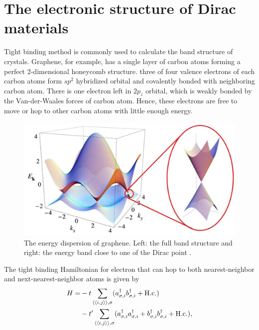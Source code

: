 \section{The electronic structure of Dirac materials}
     Tight binding method is commonly used to calculate the band structure of crystals.
     Graphene, for example, has a single layer of carbon atoms forming a perfect 2-dimensional honeycomb structure.
     three of four valence electrons of each carbon atoms form $sp^2$ hybridized orbital and covalently bonded with neighboring carbon atom.
     There is one electron left in $2p_z$ orbital, which is weakly bonded by the Van-der-Waales forces of carbon atom.
     Hence, these electrons are free to move or hop to other carbon atoms with little enough energy.\\
    \begin{figure}[H]
        \centering
        \includegraphics[width = 0.8\linewidth]{fig/Chap 2/band structure of graphene.png}
        \caption{The energy dispersion of graphene. 
                    Left: the full band structure and right: the energy band close to one of the Dirac point \cite{CastroNeto2009}.}
        \label{2fig:band structure of graphene}
    \end{figure}
     The tight binding Hamiltonian for electron that can hop to both nearest-neighbor and next-nearest-neighbor atoms is given by
     \begin{equation} \label{2eq:tight binding Hamiltonian}
         \begin{aligned}
             H = &-t \sum_{\braket{\braket{i,j}},\sigma} (a_{\sigma, i}^{\dagger} b_{\sigma,i}^{\dagger}+ \mathrm{H.c.})\\
                    &-t' \sum_{\braket{\braket{i,j}},\sigma} (a_{\sigma, i}^{\dagger} a_{\sigma,i}^{\dagger}+ b_{\sigma, i}^{\dagger} b_{\sigma,i}^{\dagger} + \mathrm{H.c.}),\\
         \end{aligned}
     \end{equation}
